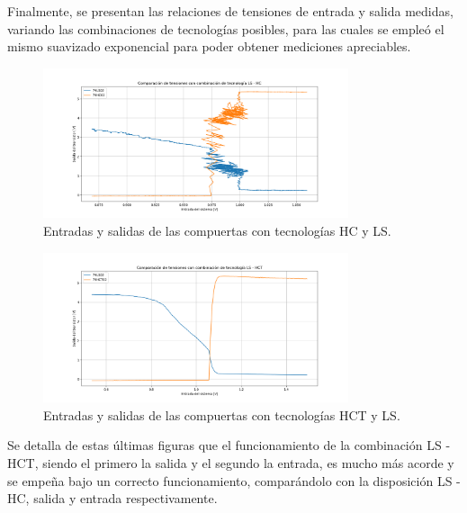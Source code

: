 Finalmente, se presentan las relaciones de tensiones de entrada y salida medidas, variando las combinaciones de tecnologías posibles, para las cuales se empleó el mismo suavizado exponencial para poder obtener mediciones apreciables.
\begin{figure}[H]
\centering
	\includegraphics[width=0.8\textwidth]{ImagenesEjercicio2/Xy-feo.png}
\caption{Entradas y salidas de las compuertas con tecnologías HC y LS.}
\label{fig:xy-feo}
\end{figure}
\begin{figure}[H]
\centering
	\includegraphics[width=0.8\textwidth]{ImagenesEjercicio2/Xy-bien.png}
\caption{Entradas y salidas de las compuertas con tecnologías HCT y LS.}
\label{fig:xy-bien}
\end{figure}

Se detalla de estas últimas figuras que el funcionamiento de la combinación LS - HCT, siendo el primero la salida y el segundo la entrada, es mucho más acorde y se empeña bajo un correcto funcionamiento, comparándolo con la disposición LS - HC, salida y entrada respectivamente.